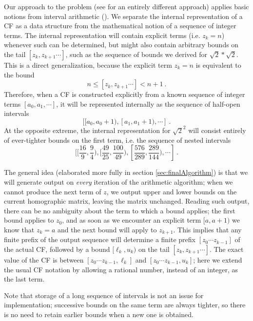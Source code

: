 \documentclass[11pt, oneside]{amsart}   	%
\renewcommand{\:}{\negthickspace:\negthickspace}
\begin{document}
Our approach to the problem (see \cite{Lester01} for an entirely different approach)
applies basic notions from interval arithmetic (\cite{doi:10.1137/1.9780898717716,Mayer+2017}).
We separate the internal representation of a CF as a data structure from the mathematical notion of a  sequence of integer terms. The
internal representation will contain explicit terms (i.e. $z_k=n$) whenever such can be determined, but might also contain arbitrary
bounds on the tail $[z_k, z_{k+1}\cdots]$, such as the  sequence of bounds we derived for $\sqrt{2}*\sqrt{2}$. This is a direct
generalization, because the explicit term  $z_k=n$ is equivalent to the bound 
\[
n \leq [z_k, z_{k+1}\cdots] < n+1 \ .
\]
Therefore, when a CF is constructed explicitly from a known sequence of integer terms $[a_0, a_1, \cdots]$,
it will be represented internally as the sequence of half-open intervals
\[
[[a_0, a_0+1),  [a_1, a_1+1), \cdots]\ .
\] 
At the opposite extreme, the internal representation for $\sqrt{2}^2$ will consist entirely of ever-tighter bounds on the first term, i.e. the sequence of nested intervals
\[
[[\frac{16}{9},\frac{9}{4}), [\frac{49}{25},\frac{100}{49}), [\frac{576}{289},\frac{289}{144}), \cdots]\ .
\] 

The general idea (elaborated more fully in section \ref{sec:finalAlgorithm}) is that we will generate output on \emph{every}
 iteration of the arithmetic algorithm; when we cannot produce the next term of $z$, we output upper and lower bounds on the current
 homographic matrix, leaving the matrix unchanged. Reading such output, there can be no ambiguity about the term to which a bound 
 applies; the first bound applies to $z_0$, and as soon as we encounter an explicit term $[a,a+1)$ we know that $z_k=a$ and the next bound will apply to $z_{k+1}$. 
 This implies that any finite prefix of the output sequence will determine a finite prefix $[z_0 \cdots z_{k-1}]$ of the actual CF, followed by a bound
 $[\ell_k,u_k)$ on the tail $[z_k, z_{k+1}\cdots]$. The exact value of the CF is between $[z_0 \cdots z_{k-1}, \ell_k]$ and
 $[z_0 \cdots z_{k-1}, u_k]$; here we extend the usual CF notation by allowing a rational number, instead of an integer, as the last term.

Note that storage of a long sequence of intervals is not an issue for implementation;
successive bounds on the same term are always tighter, so there is no need to retain earlier bounds when a new one is obtained. 
\end{document}
